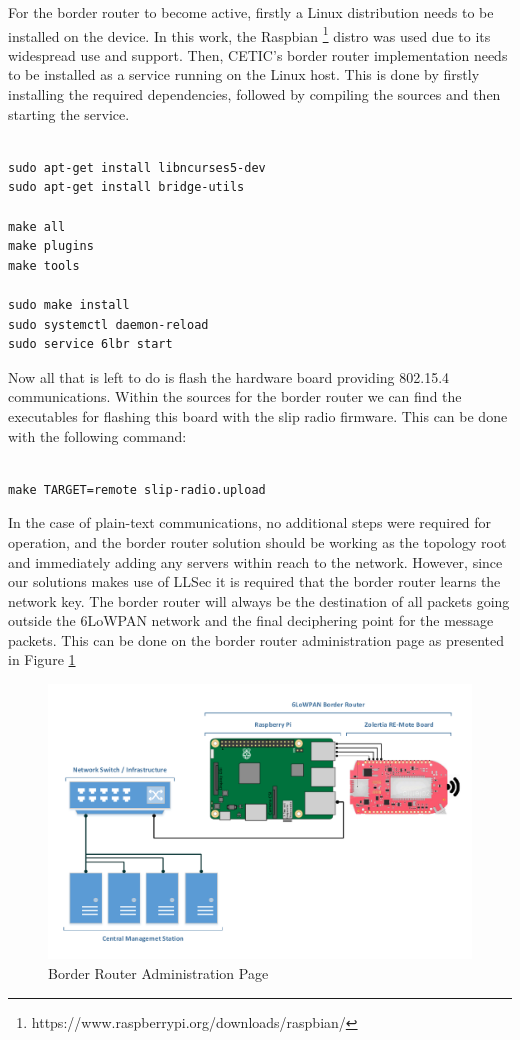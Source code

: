 For the border router to become active, firstly a Linux distribution needs to be installed on the device. In this work, the Raspbian \footnote{https://www.raspberrypi.org/downloads/raspbian/} distro was used due to its widespread use and support. Then, \gls{CETIC}'s border router implementation needs to be installed as a service running on the Linux host. This is done by firstly installing the required dependencies, followed by compiling the sources and then starting the service.

\begin{lstlisting}

sudo apt-get install libncurses5-dev
sudo apt-get install bridge-utils

make all
make plugins
make tools

sudo make install
sudo systemctl daemon-reload
sudo service 6lbr start

\end{lstlisting}

Now all that is left to do is flash the hardware board providing 802.15.4 communications. Within the sources for the border router we can find the executables for flashing this board with the slip radio firmware. This can be done with the following command:

\begin{lstlisting}

make TARGET=remote slip-radio.upload

\end{lstlisting}

In the case of plain-text communications, no additional steps were required for operation, and the border router solution should be working as the topology root and immediately adding any servers within reach to the network. However, since our solutions makes use of \gls{LLSec} it is required that the border router learns the network key. The border router will always be the destination of all packets going outside the \gls{6LoWPAN} network and the final deciphering point for the message packets. This can be done on the border router administration page as presented in Figure \ref{fig:administration_page}

\begin{figure}[h]
  \centering
  \includegraphics[width=0.8\linewidth]{figures/Border_Router.pdf}
  \caption{Border Router Administration Page}
  \label{fig:administration_page}
\end{figure}



